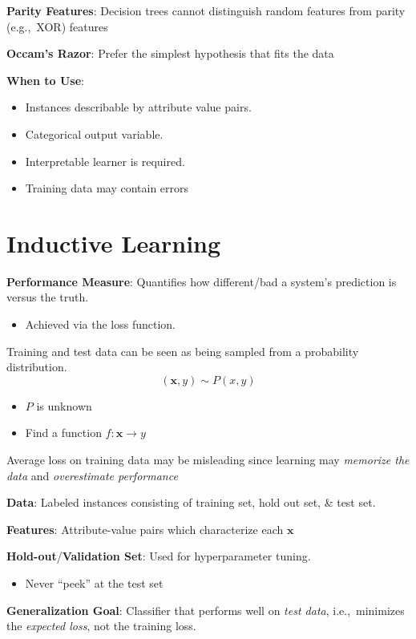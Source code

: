 \documentclass[10pt]{article}
\begin{document}
\begin{multicols}{3}
  \textbf{Parity Features}: Decision trees cannot distinguish random features from parity (e.g.,~XOR) features

  \textbf{Occam's Razor}: Prefer the simplest hypothesis that fits the data

  \textbf{When to Use}:
  \begin{itemize}
    \item Instances describable by attribute value pairs.
    \item Categorical output variable.
    \item Interpretable learner is required.
    \item Training data may contain errors
  \end{itemize}

  \section{Inductive Learning}

  \textbf{Performance Measure}: Quantifies how different/bad a system's prediction is versus the truth.
  \begin{itemize}
    \item Achieved via the loss function.
  \end{itemize}

  Training and test data can be seen as being sampled from a probability distribution.
  \[(\mathbf{x},y)\sim P(x,y)\]
  \begin{itemize}
    \item $P$ is unknown
    \item Find a function $f:\mathbf{x} \rightarrow y$
  \end{itemize}

  Average loss on training data may be misleading since learning may \textit{memorize the data} and \textit{overestimate performance}

  \textbf{Data}: Labeled instances consisting of training set, hold out set, \& test set.

  \textbf{Features}: Attribute-value pairs which characterize each $\mathbf{x}$

  \textbf{Hold-out}/\textbf{Validation Set}: Used for hyperparameter tuning.
  \begin{itemize}
    \item Never ``peek'' at the test set
  \end{itemize}

  \textbf{Generalization Goal}: Classifier that performs well on \textit{test data}, i.e.,~minimizes the \textit{expected loss}, not the training loss.


\end{multicols}
\end{document}
